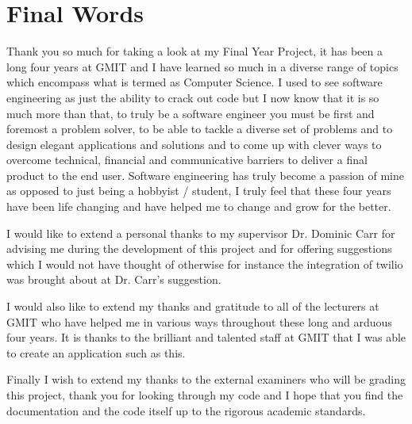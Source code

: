 \section{Final Words}
Thank you so much for taking a look at my Final Year Project, it has been a long four years at GMIT and I have learned so much in a diverse range of topics which encompass what is termed as Computer Science. I used to see software engineering as just the ability to crack out code but I now know that it is so much more than that, to truly be a software engineer you must be first and foremost a problem solver, to be able to tackle a diverse set of problems and to design elegant applications and solutions and to come up with clever ways to overcome technical, financial and communicative barriers to deliver a final product to the end user. Software engineering has truly become a passion of mine as opposed to just being a hobbyist / student, I truly feel that these four years have been life changing and have helped me to change and grow for the better.

I would like to extend a personal thanks to my supervisor Dr. Dominic Carr for advising me during the development of this project and for offering suggestions which I would not have thought of otherwise for instance the integration of twilio was brought about at Dr. Carr's suggestion.

I would also like to extend my thanks and gratitude to all of the lecturers at GMIT who have helped me in various ways throughout these long and arduous four years. It is thanks to the brilliant and talented staff at GMIT that I was able to create an application such as this.

Finally I wish to extend my thanks to the external examiners who will be grading this project, thank you for looking through my code and I hope that you find the documentation and the code itself up to the rigorous academic standards.

